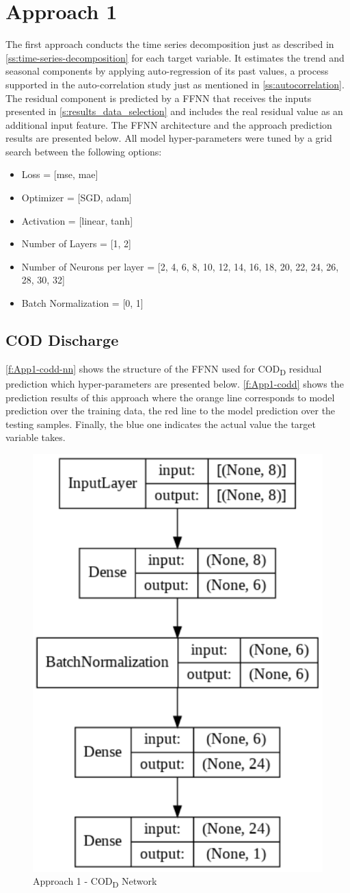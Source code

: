 \section{Approach 1}
\label{s:resutls-approach1}
The first approach conducts the time series decomposition just as described in \autoref{ss:time-series-decomposition} for each target variable. It estimates the trend and seasonal components by applying auto-regression of its past values, a process supported in the auto-correlation study just as mentioned in \autoref{ss:autocorrelation}. The residual component is predicted by a \ac{FFNN} that receives the inputs presented in \autoref{s:results_data_selection} and includes the real residual value as an additional input feature. The \ac{FFNN} architecture and the approach prediction results are presented below.
All model hyper-parameters were tuned by a grid search between the following options:

\begin{itemize}
    \item Loss = [mse, mae]
    \item Optimizer = [SGD, adam]
    \item Activation = [linear, tanh]
    \item Number of Layers = [1, 2]
    \item Number of Neurons per layer = [2, 4, 6, 8, 10, 12, 14, 16, 18, 20, 22, 24, 26, 28, 30, 32]
    \item Batch Normalization = [0, 1]
\end{itemize}

\subsection{COD Discharge}
\autoref{f:App1-codd-nn} shows the structure of the \ac{FFNN} used for \ac{COD}\textsubscript{D} residual prediction which hyper-parameters are presented below. \autoref{f:App1-codd} shows the prediction results of this approach where the orange line corresponds to model prediction over the training data, the red line to the model prediction over the testing samples. Finally, the blue one indicates the actual value the target variable takes.

\begin{figure}[h]
\centering
\includegraphics[width=0.4\linewidth]{figures/Ch5/App1_CODeq.pdf}
\caption{Approach 1 - COD\textsubscript{D} Network}
\label{f:App1-codd-nn}
\end{figure}

